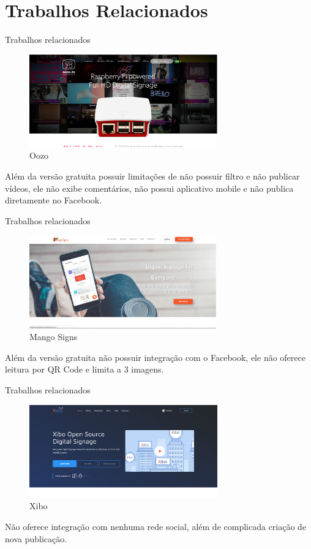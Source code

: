 \documentclass{aula-ifb}
\begin{document}
\section{Trabalhos Relacionados} 
\begin{frame}{Trabalhos relacionados}
	\begin{figure}[h]
    	\includegraphics[height=4cm]{figuras/oozo.png}
    	\caption{Oozo}
	\end{figure}
	\begin{center}
	Além da versão gratuita possuir limitações de não possuir filtro e não publicar vídeos, ele não exibe comentários, não possui aplicativo mobile e não publica diretamente no Facebook.
	\end{center}
\end{frame}

\begin{frame}{Trabalhos relacionados}
	\begin{figure}[h]
    	\includegraphics[height=4cm]{figuras/mango.png}
    	\caption{Mango Signs}
	\end{figure}
	\begin{center}
	Além da versão gratuita não possuir integração com o Facebook, ele não oferece leitura por QR Code e limita a 3 imagens.
	\end{center}
\end{frame}

\begin{frame}{Trabalhos relacionados}
	\begin{figure}[h]
    	\includegraphics[height=4cm]{figuras/xibo.png}
    	\caption{Xibo}
	\end{figure}
	\begin{center}
	Não oferece integração com nenhuma rede social, além de complicada criação de nova publicação.
	\end{center}
\end{frame}
\end{document}
